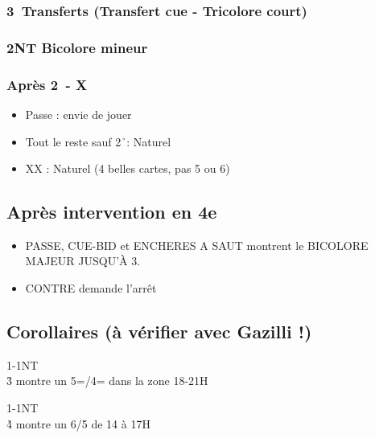 \documentclass[a4paper]{article}
\begin{document}
\subsubsection{3\pdfc\pdfd\pdfh\pdfs\ Transferts (Transfert cue - Tricolore court)}

\subsubsection{2NT Bicolore mineur}

\subsubsection{Après 2\pdfd\ - X}

\begin{itemize}
\item Passe : envie de jouer

\item Tout le reste sauf 2\h\ : Naturel

\item XX : Naturel (4 belles cartes, pas 5 ou 6)

\end{itemize}

\subsection{Après intervention en 4e}

\begin{itemize}
\item PASSE, CUE-BID et ENCHERES A SAUT montrent le BICOLORE MAJEUR JUSQU’À 3\s .

\end{itemize}

\begin{itemize}
\item CONTRE demande l’arrêt

\end{itemize}

\subsection{Corollaires (à vérifier avec Gazilli !)}

\begin{bidtable}
1\s-1NT\\
3\h \> montre un 5=/4= dans la zone 18-21H
\end{bidtable}

\begin{bidtable}
1\s-1NT\\
4\h \> montre un 6/5 de 14 à 17H
\end{bidtable}
\end{document}
